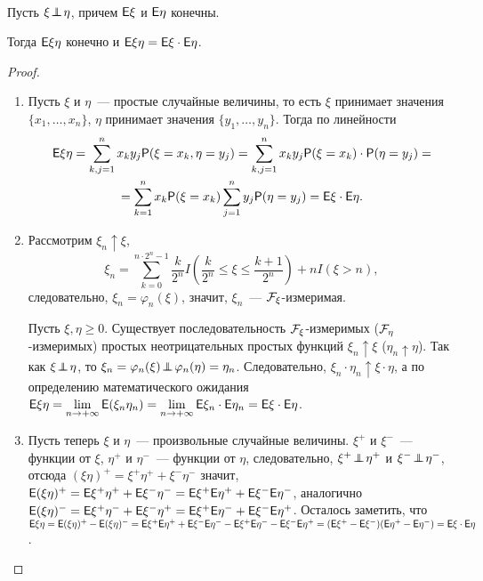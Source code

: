 \begin{theorem}~

	Пусть $\xi \!\perp\!\!\!\!\perp\! \eta$, причем $\mathsf{E} \xi$ и $\mathsf{E} \eta$ конечны. 
	
	Тогда $\mathsf{E} \xi \eta$ конечно и $\mathsf{E} \xi \eta = \mathsf{E} \xi \cdot \mathsf{E} \eta$.
	\begin{proof}
	    \begin{enumerate}
	        \item Пусть $\xi$ и $\eta$~--- простые случайные величины, то есть $\xi$ принимает значения $\{ x_1, \ldots, x_n \}$, $\eta$ принимает значения $\{ y_1, \ldots, y_n \}$. Тогда по линейности
    		\begin{multline*}
    			\mathsf{E} \xi \eta = \sum\limits_{k,j=1}^{n} x_k y_j \mathsf{P} (\xi = x_k, \eta = y_j) = \sum\limits_{k,j=1}^n x_k y_j \mathsf{P}(\xi = x_k) \cdot \mathsf{P}(\eta = y_j) = \\ = \sum\limits_{k = 1}^n x_k \mathsf{P} (\xi = x_k) \sum\limits_{j = 1}^{n} y_j \mathsf{P} (\eta = y_j) = \mathsf{E} \xi \cdot \mathsf{E} \eta.
    		\end{multline*}
    			
    		\item Рассмотрим $\xi_n \uparrow \xi$, 
    		$$\xi_n = \sum\limits_{k=0}^{n \cdot 2^n - 1} \dfrac{k}{2^n} I \left(\dfrac{k}{2^n} \leqslant \xi \leqslant \dfrac{k+1}{2^n} \right) + n I(\xi > n),$$
    		 следовательно, $\xi_n = \varphi_n(\xi)$, значит, $\xi_n$~--- $\mathcal{F}_\xi$-измеримая. 
    		 
    		 Пусть $\xi, \eta \geqslant 0$. Существует последовательность $\mathcal{F}_\xi$-измеримых ($\mathcal{F}_\eta$-измеримых) простых неотрицательных простых функций $\xi_n \uparrow \xi$ ($\eta_n \uparrow \eta$). Так как $\xi \!\perp\!\!\!\!\perp\! \eta$, то $\xi_n = \varphi_n (\xi) \!\perp\!\!\!\!\perp\! \varphi_n(\eta) = \eta_n$. Следовательно, $\xi_n \cdot \eta_n \uparrow \xi \cdot \eta$, а по определению математического ожидания $\mathsf{E} \xi\eta = \lim\limits_{n \rightarrow +\infty} \mathsf{E} (\xi_n \eta_n) =  \lim\limits_{n \rightarrow +\infty} \mathsf{E} \xi_n \cdot \mathsf{E} \eta_n = \mathsf{E} \xi \cdot \mathsf{E} \eta$.
    			
    		\item Пусть теперь $\xi$ и $\eta$~--- произвольные случайные величины. $\xi^+$ и $\xi^-$~--- функции от $\xi$, $\eta^+$ и $\eta^-$~--- функции от $\eta$, следовательно, $\xi^+ \!\perp\!\!\!\!\perp\! \eta^+$ и $\xi^- \!\perp\!\!\!\!\perp\! \eta^-$, отсюда $(\xi \eta)^+ = \xi^+ \eta^+ + \xi^- \eta^-$ значит, $\mathsf{E} (\xi \eta)^+ = \mathsf{E} \xi^+ \eta^+ + \mathsf{E} \xi^- \eta^- = \mathsf{E} \xi^+ \mathsf{E} \eta^+ + \mathsf{E} \xi^- \mathsf{E} \eta^-$, аналогично $\mathsf{E} (\xi \eta)^- = \mathsf{E} \xi^+ \eta^- + \mathsf{E} \xi^- \eta^+ = \mathsf{E} \xi^+ \mathsf{E} \eta^- + \mathsf{E} \xi^- \mathsf{E} \eta^+$. Осталось заметить, что $\mathsf{E} \xi \eta = \mathsf{E} (\xi \eta)^+ - \mathsf{E} ( \xi \eta)^- = \mathsf{E} \xi^+ \mathsf{E} \eta^+ + \mathsf{E} \xi^- \mathsf{E} \eta^- - \mathsf{E} \xi^+ \mathsf{E} \eta^- - \mathsf{E} \xi^- \mathsf{E} \eta^+ =  (\mathsf{E} \xi^+ - \mathsf{E} \xi^-) (\mathsf{E} \eta^+ - \mathsf{E} \eta^-) = \mathsf{E} \xi \cdot \mathsf{E} \eta$.
	    \end{enumerate}
	\end{proof}
\end{theorem}
	
